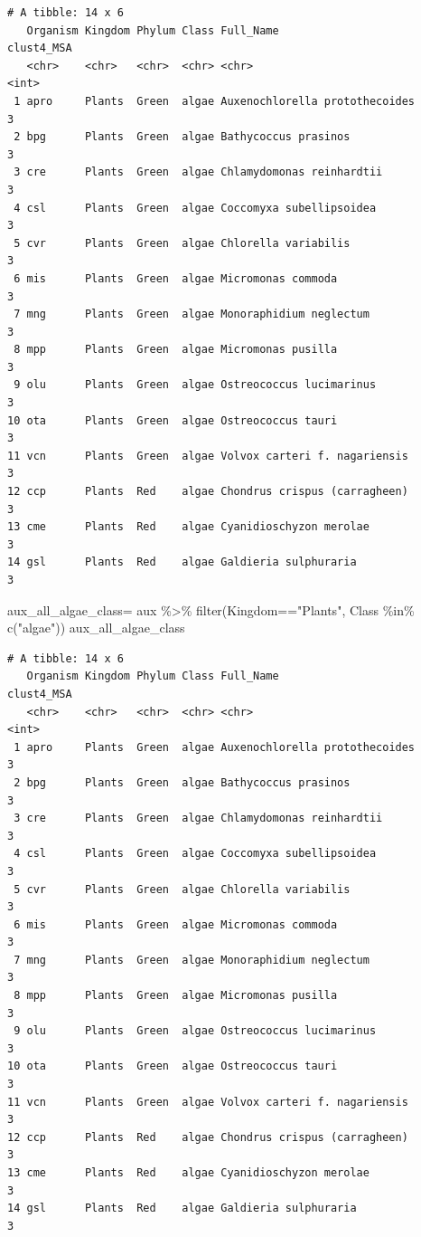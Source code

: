 \documentclass[
  letterpaper,
  DIV=11,
  numbers=noendperiod]{scrreprt}
\newenvironment{Shaded}{}{}
\newcommand{\FunctionTok}[1]{\textcolor[rgb]{0.38,0.69,0.94}{#1}}
\newcommand{\NormalTok}[1]{\textcolor[rgb]{0.67,0.70,0.75}{#1}}
\newcommand{\OtherTok}[1]{\textcolor[rgb]{0.15,0.68,0.38}{#1}}
\newcommand{\SpecialCharTok}[1]{\textcolor[rgb]{0.34,0.71,0.76}{#1}}
\newcommand{\StringTok}[1]{\textcolor[rgb]{0.60,0.76,0.47}{#1}}
\begin{document}
\begin{verbatim}
# A tibble: 14 x 6
   Organism Kingdom Phylum Class Full_Name                      clust4_MSA
   <chr>    <chr>   <chr>  <chr> <chr>                               <int>
 1 apro     Plants  Green  algae Auxenochlorella protothecoides          3
 2 bpg      Plants  Green  algae Bathycoccus prasinos                    3
 3 cre      Plants  Green  algae Chlamydomonas reinhardtii               3
 4 csl      Plants  Green  algae Coccomyxa subellipsoidea                3
 5 cvr      Plants  Green  algae Chlorella variabilis                    3
 6 mis      Plants  Green  algae Micromonas commoda                      3
 7 mng      Plants  Green  algae Monoraphidium neglectum                 3
 8 mpp      Plants  Green  algae Micromonas pusilla                      3
 9 olu      Plants  Green  algae Ostreococcus lucimarinus                3
10 ota      Plants  Green  algae Ostreococcus tauri                      3
11 vcn      Plants  Green  algae Volvox carteri f. nagariensis           3
12 ccp      Plants  Red    algae Chondrus crispus (carragheen)           3
13 cme      Plants  Red    algae Cyanidioschyzon merolae                 3
14 gsl      Plants  Red    algae Galdieria sulphuraria                   3
\end{verbatim}

\begin{Shaded}
\begin{Highlighting}[]
\NormalTok{aux\_all\_algae\_class}\OtherTok{=}\NormalTok{ aux }\SpecialCharTok{\%\textgreater{}\%} 
  \FunctionTok{filter}\NormalTok{(Kingdom}\SpecialCharTok{==}\StringTok{"Plants"}\NormalTok{,}
\NormalTok{         Class }\SpecialCharTok{\%in\%} \FunctionTok{c}\NormalTok{(}\StringTok{"algae"}\NormalTok{))}
\NormalTok{aux\_all\_algae\_class}
\end{Highlighting}
\end{Shaded}

\begin{verbatim}
# A tibble: 14 x 6
   Organism Kingdom Phylum Class Full_Name                      clust4_MSA
   <chr>    <chr>   <chr>  <chr> <chr>                               <int>
 1 apro     Plants  Green  algae Auxenochlorella protothecoides          3
 2 bpg      Plants  Green  algae Bathycoccus prasinos                    3
 3 cre      Plants  Green  algae Chlamydomonas reinhardtii               3
 4 csl      Plants  Green  algae Coccomyxa subellipsoidea                3
 5 cvr      Plants  Green  algae Chlorella variabilis                    3
 6 mis      Plants  Green  algae Micromonas commoda                      3
 7 mng      Plants  Green  algae Monoraphidium neglectum                 3
 8 mpp      Plants  Green  algae Micromonas pusilla                      3
 9 olu      Plants  Green  algae Ostreococcus lucimarinus                3
10 ota      Plants  Green  algae Ostreococcus tauri                      3
11 vcn      Plants  Green  algae Volvox carteri f. nagariensis           3
12 ccp      Plants  Red    algae Chondrus crispus (carragheen)           3
13 cme      Plants  Red    algae Cyanidioschyzon merolae                 3
14 gsl      Plants  Red    algae Galdieria sulphuraria                   3
\end{verbatim}
\end{document}
